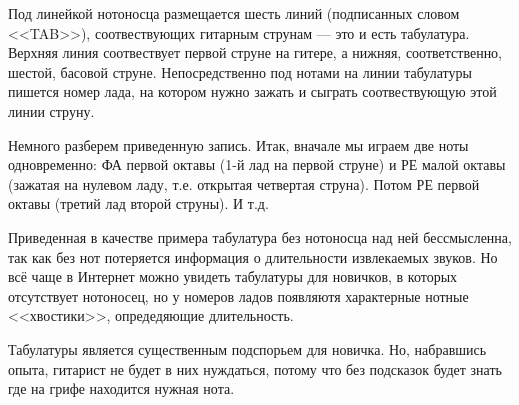 Под линейкой нотоносца размещается шесть линий (подписанных словом <<TAB>>), соотвествующих гитарным струнам --- это и есть табулатура. Верхняя линия соотвествует первой струне на гитере, а нижняя, соответственно, шестой, басовой струне. Непосредственно под нотами на линии табулатуры пишется номер лада, на котором нужно зажать и сыграть соотвествующую этой линии струну.

Немного разберем приведенную запись. Итак, вначале мы играем две ноты одновременно: ФА первой октавы (1-й лад на первой струне) и РЕ малой октавы (зажатая на нулевом ладу, т.е. открытая четвертая струна). Потом РЕ первой октавы (третий лад второй струны). И т.д.

Приведенная в качестве примера табулатура без нотоносца над ней бессмысленна, так как без нот потеряется информация о длительности извлекаемых звуков. Но всё чаще в Интернет можно увидеть табулатуры для новичков, в которых отсутствует нотоносец, но у номеров ладов появляютя характерные нотные <<хвостики>>, опредедяющие длительность.

Табулатуры является существенным подспорьем для новичка. Но, набравшись опыта, гитарист не будет в них нуждаться, потому что без подсказок будет знать где на грифе находится нужная нота.
